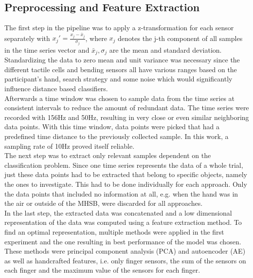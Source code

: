 \subsection{Preprocessing and Feature Extraction}
The first step in the pipeline was to apply a z-transformation for each sensor separately with $ x_{j}' = \frac{x_{j}-\bar{x}_{j}}{\sigma_{j}} $, where $ x_{j} $ denotes the j-th component of all samples in the time series vector and $ \bar{x}_{j},\sigma_{j} $ are the mean and standard deviation. Standardizing the data to zero mean and unit variance was necessary since the different tactile cells and bending sensors all have various ranges based on the participant's hand, search strategy and some noise which would significantly influence distance based classifiers.\\
Afterwards a time window was chosen to sample data from the time series at consistent intervals to reduce the amount of redundant data. The time series were recorded with 156Hz and 50Hz, resulting in very close or even similar neighboring data points. With this time window, data points were picked that had a predefined time distance to the previously collected sample. In this work, a sampling rate of 10Hz proved itself reliable.\\
The next step was to extract only relevant samples dependent on the classification problem. Since one time series represents the data of a whole trial, just these data points had to be extracted that belong to specific objects, namely the ones to investigate. This had to be done individually for each approach. Only the data points that included no information at all, e.g. when the hand was in the air or outside of the MHSB, were discarded for all approaches. \\
In the last step, the extracted data was concatenated and a low dimensional representation of the data was computed using a feature extraction method. To find an optimal representation, multiple methods were applied in the first experiment and the one resulting in best performance of the model was chosen. These methods were principal component analysis (PCA) and autoencoder (AE) as well as handcrafted features, i.e. only finger sensors, the sum of the sensors on each finger and the maximum value of the sensors for each finger.

